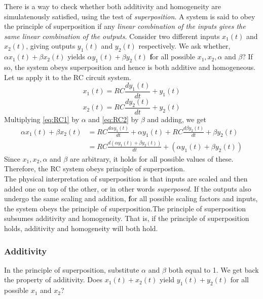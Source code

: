 There is a way to check whether both additivity and homogeneity are simulatenously satisfied, using the test of \textit{superposition}.
A system is said to obey the principle of superposition if any \textit{linear combination of the inputs gives the same linear combination of the outputs}. Consider two different inputs $x_{1}(t)$ and $x_{2}(t)$, giving outputs $y_{1}(t)$ and $y_{2}(t)$ respectively. We ask whether, $\alpha x_{1}(t) + \beta x_{2}(t)$ yields $\alpha y_{1}(t) + \beta y_{2}(t)$ {\textbf for all} possible $x_{1}, x_{2}, \alpha$ and $\beta$? If so, the system obeys superposition and hence is both additive and homogeneous. Let us apply it to the RC circuit system. 
\begin{equation}\label{eq:RC1}
x_{1}(t) = RC\frac{dy_{1}(t)}{dt} + y_{1}(t)
\end{equation}
\begin{equation}\label{eq:RC2}
x_{2}(t) = RC\frac{dy_{2}(t)}{dt} + y_{2}(t) 
\end{equation}
Multiplying \eqref{eq:RC1} by $\alpha$ and \eqref{eq:RC2} by $\beta$ and adding, we get
\begin{equation}
\begin{split}
\alpha x_{1}(t) + \beta x_{2}(t) & = RC\frac{d\alpha y_{1}(t)}{dt} + \alpha y_{1}(t) + RC\frac{d\beta y_{2}(t)}{dt} + \beta y_{2}(t) \\
& = RC\frac{d (\alpha y_{1}(t) + \beta y_{2}(t))}{dt} + (\alpha y_{1}(t) + \beta y_{2}(t))
\end{split}
\end{equation}
Since $x_{1}, x_{2}, \alpha$ and $\beta$ are arbitrary, it holds for all possible values of these. Therefore, the RC system obeys principle of superpostion. 
\\

The physical interpretation of superposition is that inputs are scaled and then added one on top of the other, or in other words \textit{superposed}. If the outputs also undergo the same scaling and addition, {\textbf for all} possible scaling factors and inputs, the system obeys the principle of superposition.The principle of superposition subsumes additivity and homogeneity. That is, if the principle of superposition holds, additivity and homogeneity will both hold.

\subsubsection*{Additivity} In the principle of superposition, substitute $\alpha$ and $\beta$ both equal to 1. We get back the property of additivity. Does $x_{1}(t) + x_{2}(t)$ yield $y_{1}(t) + y_{2}(t)$ for all possible $x_{1}$ and $x_{2}$?

